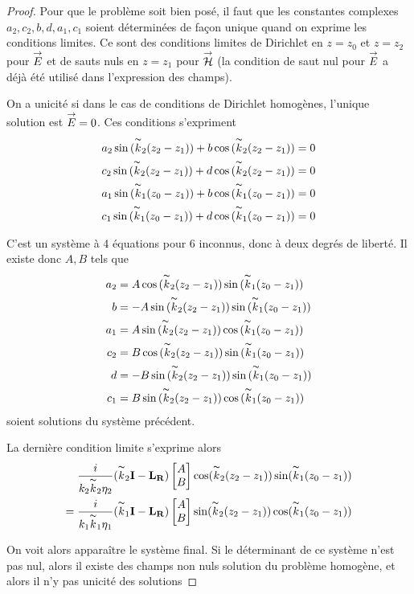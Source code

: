 \begin{proof}
  Pour que le problème soit bien posé, il faut que les constantes complexes \(a_2,c_2,b,d,a_1,c_1\) soient déterminées de façon unique quand on exprime les conditions limites. Ce sont des conditions limites de Dirichlet en \(z=z_0\) et \(z=z_2\) pour \({\overset{\rightarrow}{E}}\) et de sauts nuls en \(z=z_1\) pour \({\overset{\rightarrow}{\mathcal{H}}}\) (la condition de saut nul pour \({\overset{\rightarrow}{E}}\) a déjà été utilisé dans l'expression des champs).

  On a unicité si dans le cas de conditions de Dirichlet homogènes, l'unique solution est \({\overset{\rightarrow}{E}}=0\). Ces conditions s'expriment
  \begin{align*}
    a_2\sin{(\overset{\thicksim}{k}_2(z_2-z_1))} + b\cos{(\overset{\thicksim}{k}_2(z_2-z_1))} &= 0
    \\
    c_2\sin{(\overset{\thicksim}{k}_2(z_2-z_1))} + d\cos{(\overset{\thicksim}{k}_2(z_2-z_1))} &= 0
    \\
    a_1\sin{(\overset{\thicksim}{k}_1(z_0-z_1))} + b\cos{(\overset{\thicksim}{k}_1(z_0-z_1))} &= 0
    \\
    c_1\sin{(\overset{\thicksim}{k}_1(z_0-z_1))} + d\cos{(\overset{\thicksim}{k}_1(z_0-z_1))} &= 0
  \end{align*}

  C'est un système à 4 équations pour 6 inconnus, donc à deux degrés de liberté. Il existe donc \(A,B\) tels que
  \begin{align*}
    a_2 &= A\cos{(\overset{\thicksim}{k}_2(z_2-z_1))}\sin{(\overset{\thicksim}{k}_1(z_0-z_1))}
    \\
    b &= -A\sin{(\overset{\thicksim}{k}_2(z_2-z_1))}\sin{(\overset{\thicksim}{k}_1(z_0-z_1))}
    \\
    a_1 &= A\sin{(\overset{\thicksim}{k}_2(z_2-z_1))}\cos{(\overset{\thicksim}{k}_1(z_0-z_1))}
    \\
    c_2 &= B\cos{(\overset{\thicksim}{k}_2(z_2-z_1))}\sin{(\overset{\thicksim}{k}_1(z_0-z_1))}
    \\
    d &= -B\sin{(\overset{\thicksim}{k}_2(z_2-z_1))}\sin{(\overset{\thicksim}{k}_1(z_0-z_1))}
    \\
    c_1 &= B\sin{(\overset{\thicksim}{k}_2(z_2-z_1))}\cos{(\overset{\thicksim}{k}_1(z_0-z_1))}
  \end{align*}
  soient solutions du système précédent.

  La dernière condition limite s'exprime alors
  \begin{align*}
    \dfrac{i}{k_2\overset{\thicksim}{k}_2\eta_2}(\overset{\thicksim}{k}_2 \mathbf{I} - \mathbf{L_R})\begin{bmatrix}A\\B\end{bmatrix} \cos(\overset{\thicksim}{k}_2(z_2-z_1)) \sin(\overset{\thicksim}{k}_1(z_0-z_1))
    \\= 
    \dfrac{i}{k_1\overset{\thicksim}{k}_1\eta_1}(\overset{\thicksim}{k}_1 \mathbf{I} - \mathbf{L_R})\begin{bmatrix}A\\B\end{bmatrix} \sin(\overset{\thicksim}{k}_2(z_2-z_1)) \cos(\overset{\thicksim}{k}_1(z_0-z_1))
  \end{align*}

  On voit alors apparaître le système final. Si le déterminant de ce système n'est pas nul, alors il existe des champs non nuls solution du problème homogène, et alors il n'y pas unicité des solutions

\end{proof}